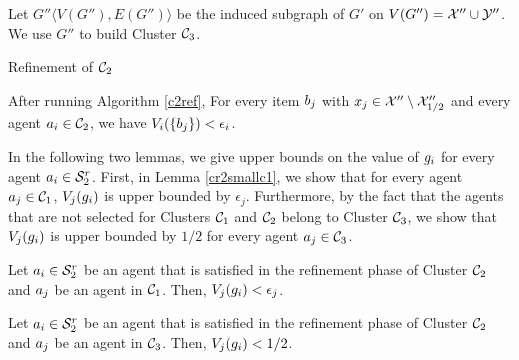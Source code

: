 Let $G'' \langle V(G''),E(G'') \rangle$ be the induced subgraph of $G'$ on $V(G'') = \mathcal{X}'' \cup \mathcal{Y}''$. We use $G''$ to build Cluster $\mathcal{C}_3$.


\begin{algorithm}[t!]
 \caption{Refinement of $\mathcal{C}_2$}
 \label{c2ref}
\end{algorithm}


\begin{observation} 
\label{fsmallc2}
After running Algorithm \ref{c2ref}, For every item $b_j$ with $x_j \in \mathcal{X}'' \setminus \mathcal{X}''_{1/2} $ and every agent $ a_i \in \mathcal{C}_2$, we have $V_i(\{b_j\}) < \epsilon_i$. 
\end{observation}


In the following two lemmas, we give upper bounds on the value of $g_i$ for every agent $a_i \in \mathcal{S}_2^r$. First, in Lemma \ref{cr2smallc1}, we show that for every agent $a_j \in \mathcal{C}_1$, $V_j(g_i)$ is upper bounded by $\epsilon_j$. Furthermore, by the fact that the agents that are not selected for Clusters $\mathcal{C}_1$ and $\mathcal{C}_2$ belong to Cluster $\mathcal{C}_3$, we show that $V_j(g_i)$ is upper bounded by $1/2$ for every agent $a_j \in \mathcal{C}_3$. 
\begin{lemma}
\label{cr2smallc1}
Let $a_i \in \mathcal{S}_2^r$ be an agent that is satisfied in the refinement phase of Cluster $\mathcal{C}_2$ and $a_j$ be an  agent in $\mathcal{C}_1$. Then, $V_j(g_i)<\epsilon_j$.
\end{lemma}


\begin{lemma}
\label{cr2smallc3}
Let $a_i \in \mathcal{S}_2^r$ be an agent that is satisfied in the refinement phase of Cluster $\mathcal{C}_2$ and $a_j$ be an agent in $\mathcal{C}_3$. Then, $V_j(g_i)< 1/2$.
\end{lemma}

